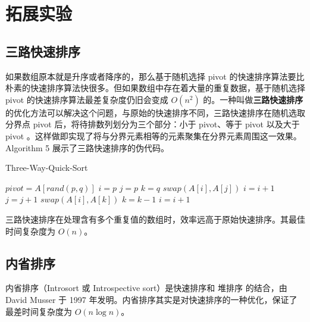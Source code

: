 \documentclass[12pt,a4paper]{article}
\begin{document}
\section{拓展实验}

\subsection{三路快速排序}

如果数组原本就是升序或者降序的，那么基于随机选择 pivot 的快速排序算法要比朴素的快速排序算法快很多。但如果数组中存在着大量的重复数据，基于随机选择 pivot 的快速排序算法最差复杂度仍旧会变成 $O(n^2)$ 的。一种叫做\textbf{三路快速排序}的优化方法可以解决这个问题，与原始的快速排序不同，三路快速排序在随机选取分界点 pivot 后，将待排数列划分为三个部分：小于 pivot、等于 pivot 以及大于 pivot 。这样做即实现了将与分界元素相等的元素聚集在分界元素周围这一效果。Algorithm 5 展示了三路快速排序的伪代码。
\begin{algorithm}[h]
    \caption{Three-Way-Quick-Sort}
    \begin{algorithmic}[1]
        \State \Return
        \EndIf
        \State $pivot = A[rand(p, q)]$
        \State $i = p$ 
        \State $j = p$ 
        \State $k = q$ 
        \State $swap(A[i], A[j])$
        \State $i = i + 1$
        \State $j = j + 1$
        \State $swap(A[i], A[k])$
        \State $k = k - 1$
        \Else
        \State $i = i + 1$
        \EndIf
        \EndWhile
        \State {}
        \State {}
        \EndFunction
    \end{algorithmic}
\end{algorithm}

三路快速排序在处理含有多个重复值的数组时，效率远高于原始快速排序。其最佳时间复杂度为 $O(n)$。

\subsection{内省排序}
内省排序（Introsort 或 Introspective sort）是快速排序和 堆排序 的结合，由 David Musser 于 1997 年发明。内省排序其实是对快速排序的一种优化，保证了最差时间复杂度为 $O(n\log n)$。
\end{document}
